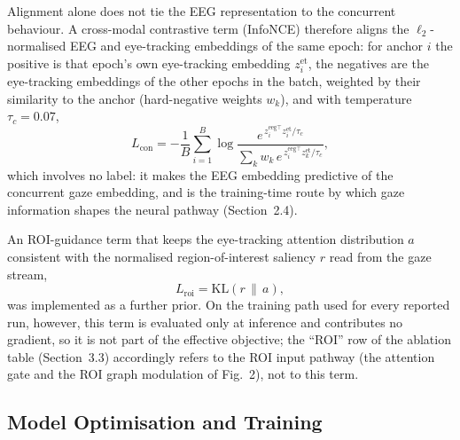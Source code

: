 \documentclass[pdflatex,sn-basic,Numbered]{sn-jnl}
\begin{document}
Alignment alone does not tie the EEG representation to the concurrent behaviour. A cross-modal contrastive term (InfoNCE) therefore aligns the $\ell_2$-normalised EEG and eye-tracking embeddings of the same epoch: for anchor $i$ the positive is that epoch's own eye-tracking embedding $z^{\mathrm{et}}_i$, the negatives are the eye-tracking embeddings of the other epochs in the batch, weighted by their similarity to the anchor (hard-negative weights $w_k$), and with temperature $\tau_c=0.07$,
\begin{equation}
L_{\mathrm{con}} = -\frac{1}{B}\sum_{i=1}^{B} \log \frac{e^{\,z^{\mathrm{eeg}\top}_i z^{\mathrm{et}}_i/\tau_c}}{\sum_{k} w_k\, e^{\,z^{\mathrm{eeg}\top}_i z^{\mathrm{et}}_k/\tau_c}}, \label{eq22}
\end{equation}
which involves no label: it makes the EEG embedding predictive of the concurrent gaze embedding, and is the training-time route by which gaze information shapes the neural pathway (Section~2.4).

An ROI-guidance term that keeps the eye-tracking attention distribution $a$ consistent with the normalised region-of-interest saliency $r$ read from the gaze stream,
\begin{equation}
L_{\mathrm{roi}} = \mathrm{KL}(r\,\|\,a), \label{eq23}
\end{equation}
was implemented as a further prior. On the training path used for every reported run, however, this term is evaluated only at inference and contributes no gradient, so it is not part of the effective objective; the ``ROI'' row of the ablation table (Section~3.3) accordingly refers to the ROI input pathway (the attention gate and the ROI graph modulation of Fig.~2), not to this term.

\subsection{Model Optimisation and Training}\label{subsec2.5.10}
\end{document}
